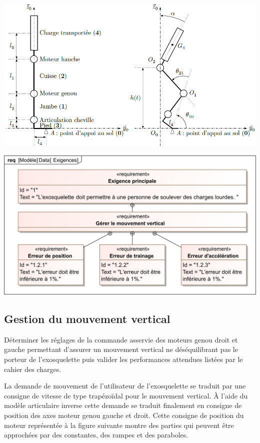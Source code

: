 \documentclass[10pt,fleqn]{article} %
\begin{document}
\begin{multicols}{2}
\begin{center}
\includegraphics[width=\linewidth]{images/fig_03}
\end{center}

\begin{center}
\includegraphics[width=\linewidth]{images/Exigences}
\end{center}
\fi

\subsection*{Gestion du mouvement vertical}

\begin{obj}
Déterminer les réglages de la commande asservie des moteurs genou droit et gauche permettant d’assurer un mouvement vertical ne déséquilibrant pas le porteur de l’exosquelette puis valider les performances attendues listées par le cahier des charges.
\end{obj}


\ifprof
\else
La demande de mouvement de l’utilisateur de l’exosquelette se traduit par une consigne de vitesse de type
trapézoïdal pour le mouvement vertical. À l’aide du modèle articulaire inverse cette
demande se traduit finalement en consigne de position des axes moteur genou gauche et droit. Cette consigne de position du moteur représentée à la figure suivante montre des parties qui peuvent être approchées par des constantes,
des rampes et des paraboles.


\end{multicols}
\end{document}
